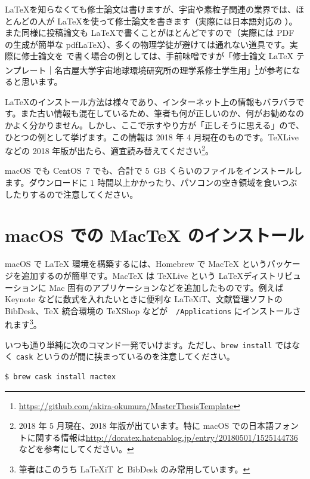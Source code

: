 \LaTeX を知らなくても修士論文は書けますが、宇宙や素粒子関連の業界では、ほとんどの人が \LaTeX を使って修士論文を書きます（実際には日本語対応の \pLaTeX）。また同様に投稿論文も \LaTeX で書くことがほとんどですので（実際には PDF の生成が簡単な pdf\LaTeX）、多くの物理学徒が避けては通れない道具です。実際に修士論文を \pLaTeX で書く場合の例としては、手前味噌ですが「修士論文 LaTeX テンプレート｜名古屋大学宇宙地球環境研究所の理学系修士学生用」\footnote{\url{https://github.com/akira-okumura/MasterThesisTemplate}}が参考になると思います。

\LaTeX のインストール方法は様々であり、インターネット上の情報もバラバラです。また古い情報も混在しているため、筆者も何が正しいのか、何がお勧めなのかよく分かりません。しかし、ここで示すやり方が「正しそうに思える」ので、ひとつの例として挙げます。この情報は 2018 年 4 月現在のものです。TeXLive などの 2018 年版が出たら、適宜読み替えてください\footnote{2018 年 5 月現在、2018 年版が出ています。特に macOS での日本語フォントに関する情報は\url{http://doratex.hatenablog.jp/entry/20180501/1525144736}などを参考にしてください。}。

macOS でも CentOS~7 でも、合計で 5~GB くらいのファイルをインストールします。ダウンロードに 1 時間以上かかったり、パソコンの空き領域を食いつぶしたりするので注意してください。

\section{macOS での MacTeX のインストール}

macOS で LaTeX 環境を構築するには、Homebrew で MacTeX というパッケージを追加するのが簡単です。MacTeX は TeXLive という \LaTeX ディストリビューションに Mac 固有のアプリケーションなどを追加したものです。例えば Keynote などに数式を入れたいときに便利な LaTeXiT、文献管理ソフトの BibDesk、TeX 統合環境の TeXShop などが　\texttt{/Applications} にインストールされます\footnote{筆者はこのうち LaTeXiT と BibDesk のみ常用しています。}。

いつも通り単純に次のコマンド一発でいけます。ただし、\texttt{brew install} ではなく \texttt{cask} というのが間に挟まっているのを注意してください。
\begin{lstlisting}[language=bash]
$ brew cask install mactex
\end{lstlisting}


